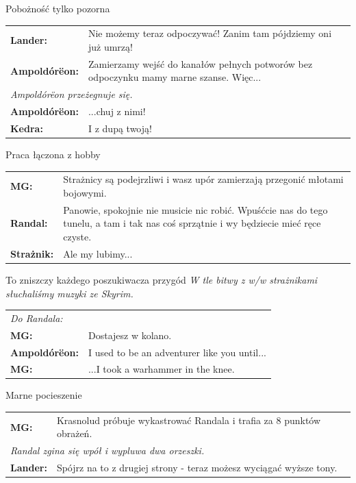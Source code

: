 \documentclass[10pt,twoside,twocolumn]{book}
\begin{document}
\begin{rpg-quotebox}{Pobożność tylko pozorna}
   \begin{tabularx}{\columnwidth}{lX}
      \textbf{Lander:} & Nie możemy teraz odpoczywać! Zanim tam pójdziemy oni już umrzą!\\
      \textbf{Ampoldórëon:} & Zamierzamy wejść do kanałów pełnych potworów bez odpoczynku mamy marne szanse. Więc...\\
      \multicolumn{2}{l}{\textit{Ampoldórëon przeżegnuje się.}}\\
      \textbf{Ampoldórëon:} & ...chuj z nimi!\\
      \textbf{Kedra:} & I z dupą twoją!\\
   \end{tabularx}
\end{rpg-quotebox}


\begin{rpg-quotebox}{Praca łączona z hobby}
   \begin{tabularx}{\columnwidth}{lX}
      \textbf{MG:} & Strażnicy są podejrzliwi i wasz upór zamierzają przegonić młotami bojowymi.\\
      \textbf{Randal:} & Panowie, spokojnie nie musicie nic robić. Wpuśćcie nas do tego tunelu, a tam i tak nas coś sprzątnie i wy będziecie mieć ręce czyste.\\
      \textbf{Strażnik:} & Ale my lubimy...\\
   \end{tabularx}
\end{rpg-quotebox}


\begin{rpg-quotebox}{To zniszczy każdego poszukiwacza przygód}
   \textit{W tle bitwy z w/w strażnikami słuchaliśmy muzyki ze Skyrim.}\\

   \begin{tabularx}{\columnwidth}{lX}
      \multicolumn{2}{l}{\textit{Do Randala:}}\\
      \textbf{MG:} & Dostajesz w kolano.\\
      \textbf{Ampoldórëon:} & I used to be an adventurer like you until...\\
      \textbf{MG:} & ...I took a warhammer in the knee.\\
   \end{tabularx}
\end{rpg-quotebox}


\begin{rpg-quotebox}{Marne pocieszenie}
   \begin{tabularx}{\columnwidth}{lX}
      \textbf{MG:} & Krasnolud próbuje wykastrować Randala i trafia za 8 punktów obrażeń.\\
      \multicolumn{2}{l}{\textit{Randal zgina się wpół i wypluwa dwa orzeszki.}}\\
      \textbf{Lander:} & Spójrz na to z drugiej strony - teraz możesz wyciągać wyższe tony.\\
   \end{tabularx}
\end{rpg-quotebox}
\end{document}
